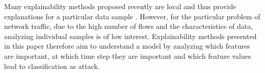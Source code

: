 \documentclass[conference]{IEEEtran}
\begin{document}
Many explainability methods proposed recently are local and thus provide explanations for a particular data sample \cite{shapley_value_1953,lundberg_unified_2017,dhurandhar_model_2018,ribeiro_why_2016}. However, for the particular problem of network traffic, due to the high number of flows and the characteristics of data, analyzing individual samples is of low interest. Explainability methods presented in this paper therefore aim to understand a model by analyzing which features are important, at which time step they are important and which feature values lead to classification as attack.

\end{document}
